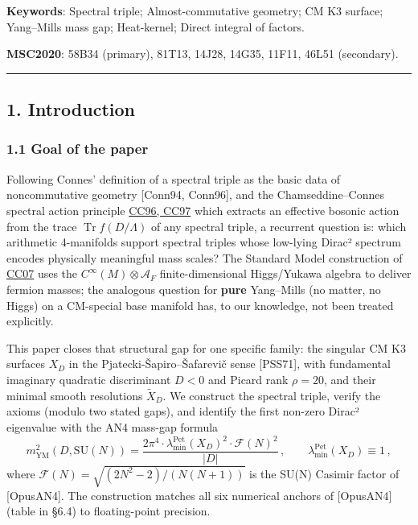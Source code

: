 \documentclass[
  11pt,
  a4paper,
]{amsart}
\begin{document}
\textbf{Keywords}: Spectral triple; Almost-commutative geometry; CM K3 surface;
Yang--Mills mass gap; Heat-kernel; Direct integral of factors.

\textbf{MSC2020}: 58B34 (primary), 81T13, 14J28, 14G35, 11F11, 46L51 (secondary).

\begin{center}\rule{0.5\linewidth}{0.5pt}\end{center}

\hypertarget{introduction}{%
\subsection{1. Introduction}\label{introduction}}

\hypertarget{goal-of-the-paper}{%
\subsubsection{1.1 Goal of the paper}\label{goal-of-the-paper}}

Following Connes' definition of a spectral triple as the basic data of
noncommutative geometry {[}Conn94, Conn96{]}, and the Chamseddine--Connes spectral
action principle \href{spectral\%20action\%20principle\%20on\%20general\%20almost-commutative}{CC96, CC97} which extracts an effective bosonic action from
the trace \(\operatorname{Tr} f(D/\Lambda)\) of any spectral triple, a recurrent
question is: which arithmetic 4-manifolds support spectral triples whose
low-lying Dirac² spectrum encodes physically meaningful mass scales? The
Standard Model construction of \href{Standard\%20Model\%20spectral\%20triple\%20on\%20$/mathbb\%7BR\%7D\%5E4\%20/otimes\%20/mathcal\%7BA\%7D_F$}{CC07} uses the \(C^\infty(M) \otimes \mathcal{A}_F\)
finite-dimensional Higgs/Yukawa algebra to deliver fermion masses; the analogous
question for \textbf{pure} Yang--Mills (no matter, no Higgs) on a CM-special base
manifold has, to our knowledge, not been treated explicitly.

This paper closes that structural gap for one specific family: the singular CM
K3 surfaces \(X_D\) in the Pjatecki-Šapiro--Šafarevič sense {[}PSS71{]}, with
fundamental imaginary quadratic discriminant \(D < 0\) and Picard rank \(\rho = 20\),
and their minimal smooth resolutions \(\widetilde{X}_D\). We construct the
spectral triple, verify the axioms (modulo two stated gaps), and identify the
first non-zero Dirac² eigenvalue with the AN4 mass-gap formula
\begin{equation}\label{eq:AN4}
m_{\mathrm{YM}}^2(D, \mathrm{SU}(N)) = \frac{2\pi^4 \cdot \lambda_{\min}^{\mathrm{Pet}}(X_D)^2 \cdot \mathcal{F}(N)^2}{|D|}\,, \qquad \lambda_{\min}^{\mathrm{Pet}}(X_D) \equiv 1\,,
\end{equation}
where \(\mathcal{F}(N) = \sqrt{(2N^2-2)/(N(N+1))}\) is the SU(N) Casimir factor of
{[}OpusAN4{]}. The construction matches all six numerical anchors of {[}OpusAN4{]}
(table in §6.4) to floating-point precision.
\end{document}
